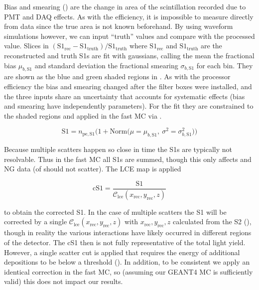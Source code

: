 Bias and smearing () are the change in area of the scintillation recorded due to PMT and DAQ
effects.  As with the efficiency, it is impossible to measure directly from data since the true area is not known beforehand.  By using
waveform simulations however, we can input
``truth'' values and compare with the processed value.  Slices in $(\mathrm{S1_{rec}} - \mathrm{S1_{truth}}) / \mathrm{S1_{truth}}$ where
$\mathrm{S1_{rec}}$ and $\mathrm{S1_{truth}}$ are the reconstructed and truth S1s are fit with gaussians, calling the mean
the fractional bias $\mu_{b, \mathrm{S1}}$ and standard deviation the fractional smearing $\sigma_{b, \mathrm{S1}}$ for each bin.  They
are shown as the blue and green shaded regions in
.  As with the processor efficiency the bias and smearing changed after
the filter boxes were installed, and the three inputs share an uncertainty that accounts for systematic effects (bias and smearing have
independently parameters).  For the fit they are constrained to the shaded regions and applied
in the fast MC via .

\begin{equation}
\mathrm{S1} = n_{\mathrm{pe,S1}} \Big( 1 + \mathrm{Norm} \big( \mu = \mu_{b, \mathrm{S1}},\ \sigma^2 = \sigma_{b, \mathrm{S1}}^2 \big)
\Big)
\label{eq:er_nr_calibrations_parameter_determ_det_phys_s1_bias_smear}
\end{equation}

Because multiple scatters happen so close in time the S1s are typically not resolvable.  Thus in the fast MC all S1s are summed, though
this only affects \ambe and NG data (\betadecay of  should not scatter).  The LCE map is applied

\begin{equation}
\mathrm{cS1} = \frac{\mathrm{S1}}{\mathcal{C}_{\mathrm{lce}}(x_{\mathrm{rec}}, y_{\mathrm{rec}}, z)}
\label{eq:er_nr_calibrations_parameter_determ_det_phys_cs1}
\end{equation}

\noindent to obtain the corrected S1.  In the case of multiple scatters the S1 will be corrected by a single
$\mathcal{C}_{\mathrm{lce}}(x_{\mathrm{rec}}, y_{\mathrm{rec}}, z)$ with $x_{\mathrm{rec}}, y_{\mathrm{rec}}, z$ calculated from the S2
(), though in reality the various interactions have
likely occurred in different regions of the detector.  The cS1 then is not fully representative of the total light yield.  However,
a single scatter cut is applied that requires the energy of additional depositions to be below a threshold
().  In addition, to be
consistent we apply an identical correction in the fast MC, so (assuming our GEANT4 MC is sufficiently valid) this does not impact our
results.

